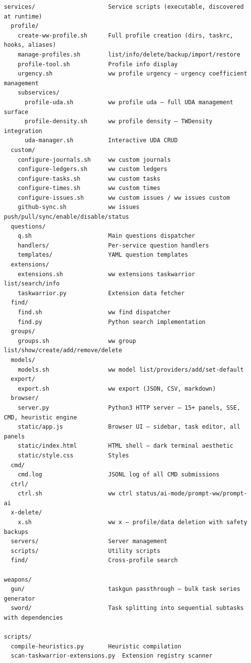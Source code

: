 \documentclass[11pt, a4paper, DIV=14]{scrartcl}
\begin{document}
\begin{verbatim}
services/                     Service scripts (executable, discovered at runtime)
  profile/
    create-ww-profile.sh      Full profile creation (dirs, taskrc, hooks, aliases)
    manage-profiles.sh        list/info/delete/backup/import/restore
    profile-tool.sh           Profile info display
    urgency.sh                ww profile urgency — urgency coefficient management
    subservices/
      profile-uda.sh          ww profile uda — full UDA management surface
      profile-density.sh      ww profile density — TWDensity integration
      uda-manager.sh          Interactive UDA CRUD
  custom/
    configure-journals.sh     ww custom journals
    configure-ledgers.sh      ww custom ledgers
    configure-tasks.sh        ww custom tasks
    configure-times.sh        ww custom times
    configure-issues.sh       ww custom issues / ww issues custom
    github-sync.sh            ww issues push/pull/sync/enable/disable/status
  questions/
    q.sh                      Main questions dispatcher
    handlers/                 Per-service question handlers
    templates/                YAML question templates
  extensions/
    extensions.sh             ww extensions taskwarrior list/search/info
    taskwarrior.py            Extension data fetcher
  find/
    find.sh                   ww find dispatcher
    find.py                   Python search implementation
  groups/
    groups.sh                 ww group list/show/create/add/remove/delete
  models/
    models.sh                 ww model list/providers/add/set-default
  export/
    export.sh                 ww export (JSON, CSV, markdown)
  browser/
    server.py                 Python3 HTTP server — 15+ panels, SSE, CMD, heuristic engine
    static/app.js             Browser UI — sidebar, task editor, all panels
    static/index.html         HTML shell — dark terminal aesthetic
    static/style.css          Styles
  cmd/
    cmd.log                   JSONL log of all CMD submissions
  ctrl/
    ctrl.sh                   ww ctrl status/ai-mode/prompt-ww/prompt-ai
  x-delete/
    x.sh                      ww x — profile/data deletion with safety backups
  servers/                    Server management
  scripts/                    Utility scripts
  find/                       Cross-profile search

weapons/
  gun/                        taskgun passthrough — bulk task series generator
  sword/                      Task splitting into sequential subtasks with dependencies

scripts/
  compile-heuristics.py       Heuristic compilation
  scan-taskwarrior-extensions.py  Extension registry scanner


\end{verbatim}
\end{document}
